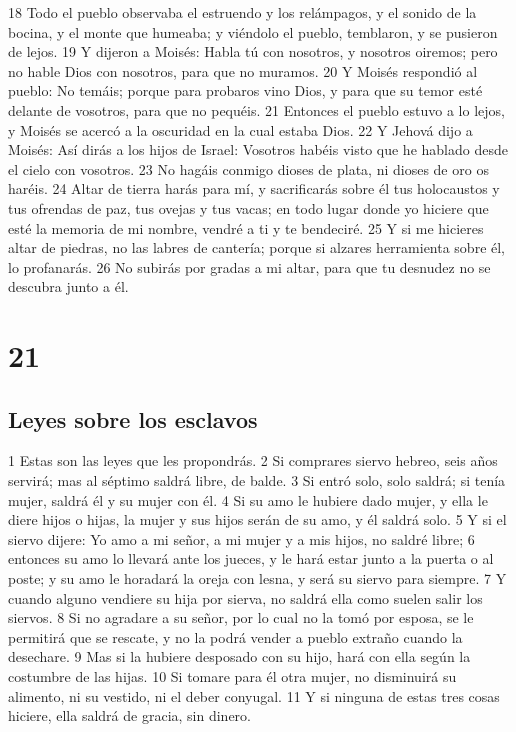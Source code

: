 18 Todo el pueblo observaba el estruendo y los relámpagos, y el sonido de la bocina, y el monte que humeaba; y viéndolo el pueblo, temblaron, y se pusieron de lejos.
19 Y dijeron a Moisés: Habla tú con nosotros, y nosotros oiremos; pero no hable Dios con nosotros, para que no muramos.
20 Y Moisés respondió al pueblo: No temáis; porque para probaros vino Dios, y para que su temor esté delante de vosotros, para que no pequéis.
21 Entonces el pueblo estuvo a lo lejos, y Moisés se acercó a la oscuridad en la cual estaba Dios.
22 Y Jehová dijo a Moisés: Así dirás a los hijos de Israel: Vosotros habéis visto que he hablado desde el cielo con vosotros.
23 No hagáis conmigo dioses de plata, ni dioses de oro os haréis.
24 Altar de tierra harás para mí, y sacrificarás sobre él tus holocaustos y tus ofrendas de paz, tus ovejas y tus vacas; en todo lugar donde yo hiciere que esté la memoria de mi nombre, vendré a ti y te bendeciré.
25 Y si me hicieres altar de piedras, no las labres de cantería; porque si alzares herramienta sobre él, lo profanarás.
26 No subirás por gradas a mi altar, para que tu desnudez no se descubra junto a él.

\chapter{21}

\section*{Leyes sobre los esclavos}

1 Estas son las leyes que les propondrás.
2 Si comprares siervo hebreo, seis años servirá; mas al séptimo saldrá libre, de balde.
3 Si entró solo, solo saldrá; si tenía mujer, saldrá él y su mujer con él.
4 Si su amo le hubiere dado mujer, y ella le diere hijos o hijas, la mujer y sus hijos serán de su amo, y él saldrá solo.
5 Y si el siervo dijere: Yo amo a mi señor, a mi mujer y a mis hijos, no saldré libre;
6 entonces su amo lo llevará ante los jueces, y le hará estar junto a la puerta o al poste; y su amo le horadará la oreja con lesna, y será su siervo para siempre.
7 Y cuando alguno vendiere su hija por sierva, no saldrá ella como suelen salir los siervos.
8 Si no agradare a su señor, por lo cual no la tomó por esposa, se le permitirá que se rescate, y no la podrá vender a pueblo extraño cuando la desechare.
9 Mas si la hubiere desposado con su hijo, hará con ella según la costumbre de las hijas.
10 Si tomare para él otra mujer, no disminuirá su alimento, ni su vestido, ni el deber conyugal.
11 Y si ninguna de estas tres cosas hiciere, ella saldrá de gracia, sin dinero.

